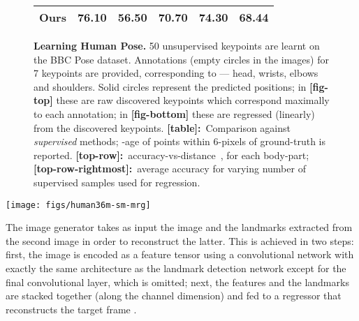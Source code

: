 \documentclass{article}
\makeatletter
\renewcommand{\paragraph}{\@startsection{paragraph}{4}{\z@}{0em}{-1em}{\normalfont\normalsize\bfseries}}
\makeatother
\begin{document}
\begin{figure}[t!]
\begin{minipage}{\textwidth}
\begin{minipage}[b]{0.47\textwidth}
{\begin{tabular}{@{}llllll@{}}
Ours            & 76.10                    & 56.50                      & 70.70                      & 74.30                         & 68.44
\\ \bottomrule
\end{tabular}}
    \captionsetup[table]{labelformat=empty}
    \captionsetup[table]{labelformat=empty}
  \end{minipage}
\end{minipage}
\caption{{\bf Learning Human Pose.} 50 unsupervised keypoints are learnt on the
         BBC Pose dataset. Annotations (empty circles in the images) for 7
         keypoints are provided, corresponding to --- head, wrists, elbows and shoulders.
         Solid circles represent the predicted positions;
         in {\bf [fig-top]} these are raw discovered keypoints which correspond
         maximally to each annotation; in {\bf [fig-bottom]} these are regressed
         (linearly) from the discovered keypoints.
        {\bf [table]:}~Comparison against \emph{supervised} methods;
        -age of points within  6-pixels of ground-truth is reported.
        {\bf [top-row]:}~accuracy-vs-distance~, for each body-part;
        {\bf [top-row-rightmost]:}~average accuracy for varying number of supervised samples used for regression.}\label{fig:bbc-paper}\end{figure}



 \begin{figure*}[b]
\centering
\texttt{[image: figs/human36m-sm-mrg]}
\caption{{\bf Unsupervised Landmarks on Human3.6M.} {\bf [left]:} an example quadruplet source-target-reconstruction-keypoint (left to right) from Human3.6M. {\bf [right]:} learned keypoints on a test video sequence. The landmarks consistently track the legs, arms, torso and head across frames.}\label{fig:human36m}
\label{fig:human36m}
\end{figure*}
 
\paragraph{Image generation network.}

The image generator takes as input the image  and the landmarks  extracted from the second image in order to reconstruct the latter. This is achieved in two steps: first, the image  is encoded as a feature tensor  using a convolutional network with exactly the same architecture as the landmark detection network except for the final  convolutional layer, which is omitted; next, the features  and the landmarks  are stacked together (along the channel dimension) and fed to a regressor that reconstructs the target frame .
\end{document}
